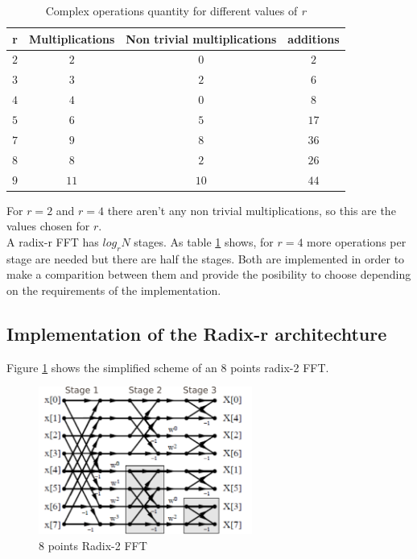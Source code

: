 \documentclass[conference]{IEEEtran}
\begin{document}
\begin{table}[h]
\begin{tabular}{c c c c}
\textbf{r} & \textbf{Multiplications} & \textbf{Non trivial multiplications} &
\textbf{additions} \\ \hline 
$2$ & $2$ & $0$ & $2$ \\
$3$ & $3$ & $2$ & $6$ \\
$4$ & $4$ & $0$ & $8$ \\
$5$ & $6$ & $5$ & $17$ \\
$7$ & $9$ & $8$ & $36$ \\
$8$ & $8$ & $2$ & $26$ \\
$9$ & $11$ & $10$ & $44$ \\ \hline
\end{tabular}
\caption{Complex operations quantity for different values of \textit{r}}
\label{table:fft_oper}
\end{table}
 
For $r=2$ and $r=4$ there aren't any non trivial multiplications, so this are the values chosen for $r$.\\
A radix-r FFT has $log_rN$ stages. As table \ref{table:fft_oper} shows, for $r=4$ more operations per stage are needed but there are
half the stages. Both are implemented in order to make a comparition between them and provide the posibility to choose
depending on the requirements of the implementation.

\subsection{Implementation of the Radix-r architechture}

Figure \ref{fig:r2_8} shows the simplified scheme of an $8$ points radix-2 FFT.

\begin{figure}[htb!]
        \centering
        \includegraphics[width=7cm]{./figures/r2_8.png}
        \caption{8 points Radix-2 FFT}
        \label{fig:r2_8}
\end{figure}
\end{document}
